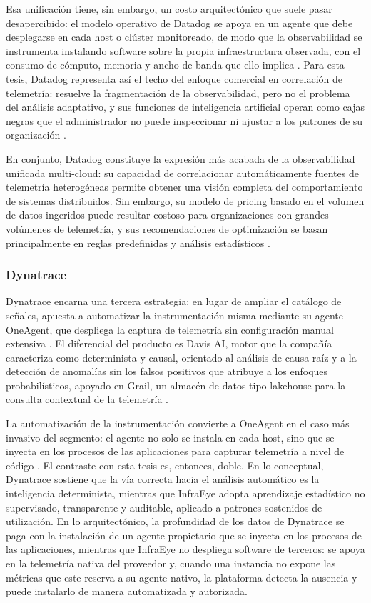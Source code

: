 Esa unificación tiene, sin embargo, un costo arquitectónico que suele pasar desapercibido: el modelo operativo de Datadog se apoya en un agente que debe desplegarse en cada host o clúster monitoreado, de modo que la observabilidad se instrumenta instalando software sobre la propia infraestructura observada, con el consumo de cómputo, memoria y ancho de banda que ello implica \parencite{Datadog2026}. Para esta tesis, Datadog representa así el techo del enfoque comercial en correlación de telemetría: resuelve la fragmentación de la observabilidad, pero no el problema del análisis adaptativo, y sus funciones de inteligencia artificial operan como cajas negras que el administrador no puede inspeccionar ni ajustar a los patrones de su organización \parencite{Datadog2026}.

En conjunto, Datadog constituye la expresión más acabada de la observabilidad unificada multi-cloud: su capacidad de correlacionar automáticamente fuentes de telemetría heterogéneas permite obtener una visión completa del comportamiento de sistemas distribuidos. Sin embargo, su modelo de pricing basado en el volumen de datos ingeridos puede resultar costoso para organizaciones con grandes volúmenes de telemetría, y sus recomendaciones de optimización se basan principalmente en reglas predefinidas y análisis estadísticos \parencite{Datadog2026}.

\subsubsection{Dynatrace}

Dynatrace encarna una tercera estrategia: en lugar de ampliar el catálogo de señales, apuesta a automatizar la instrumentación misma mediante su agente OneAgent, que despliega la captura de telemetría sin configuración manual extensiva \parencite{Dynatrace2026}. El diferencial del producto es Davis AI, motor que la compañía caracteriza como determinista y causal, orientado al análisis de causa raíz y a la detección de anomalías sin los falsos positivos que atribuye a los enfoques probabilísticos, apoyado en Grail, un almacén de datos tipo lakehouse para la consulta contextual de la telemetría \parencite{Dynatrace2026}.

La automatización de la instrumentación convierte a OneAgent en el caso más invasivo del segmento: el agente no solo se instala en cada host, sino que se inyecta en los procesos de las aplicaciones para capturar telemetría a nivel de código \parencite{Dynatrace2026}. El contraste con esta tesis es, entonces, doble. En lo conceptual, Dynatrace sostiene que la vía correcta hacia el análisis automático es la inteligencia determinista, mientras que InfraEye adopta aprendizaje estadístico no supervisado, transparente y auditable, aplicado a patrones sostenidos de utilización. En lo arquitectónico, la profundidad de los datos de Dynatrace se paga con la instalación de un agente propietario que se inyecta en los procesos de las aplicaciones, mientras que InfraEye no despliega software de terceros: se apoya en la telemetría nativa del proveedor y, cuando una instancia no expone las métricas que este reserva a su agente nativo, la plataforma detecta la ausencia y puede instalarlo de manera automatizada y autorizada.

